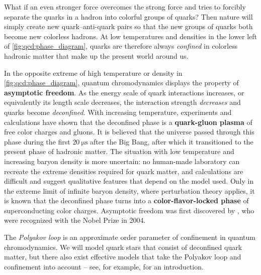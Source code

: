 What if an even stronger force overcomes the strong force and tries to forcibly separate the quarks in a hadron into colorful groups of quarks?
Then nature will simply create new quark--anti-quark pairs so that the new groups of quarks both become new colorless hadrons.
At low temperatures and densities in the lower left of \cref{fig:qcd:phase_diagram}, quarks are therefore always \emph{confined}
in colorless hadronic matter that make up the present world around us.

In the opposite extreme of high temperature or density in \cref{fig:qcd:phase_diagram}, quantum chromodynamics displays the property of \textbf{asymptotic freedom}.
As the energy scale of quark interactions increases, or equivalently its length scale decreases, the interaction strength \emph{decreases} and quarks become \emph{deconfined}.
With increasing temperature, experiments and calculations have shown that the deconfined phase is a \textbf{quark-gluon plasma} of free color charges and gluons.
It is believed that the universe passed through this phase during the first $\SI{20}{\micro\second}$ after the Big Bang, after which it transitioned to the present phase of hadronic matter.
The situation with low temperature and increasing baryon density is more uncertain:
no human-made laboratory can recreate the extreme densities required for quark matter,
and calculations are difficult and suggest qualitative features that depend on the model used.
Only in the extreme limit of infinite baryon density, where perturbation theory applies,
it is known that the deconfined phase turns into a \textbf{color-flavor-locked phase} of superconducting color charges.
Asymptotic freedom was first discovered by \cite{ref:asymptotic_freedom_gross_wilczek,ref:asymptotic_freedom_politzer}, who were recognized with the Nobel Prize in 2004.

The \emph{Polyakov loop} is an approximate order parameter of confinement in quantum chromodynamics.
We will model quark stars that consist of deconfined quark matter,
but there also exist effective models that take the Polyakov loop and confinement into account
-- see, for example, \cite{ref:master_folkestad} for an introduction.


